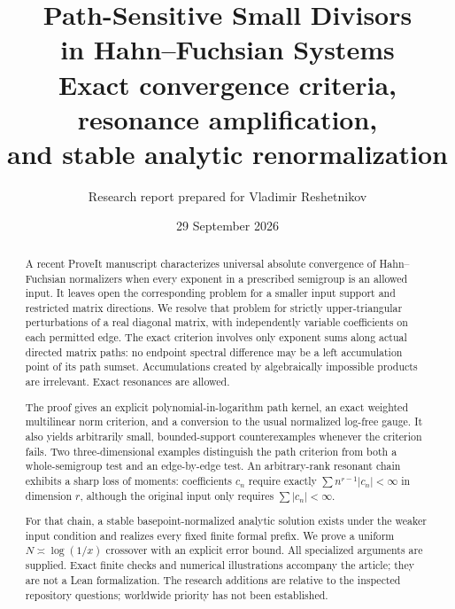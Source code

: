 \documentclass[11pt,a4paper]{article}
\title{\textbf{Path-Sensitive Small Divisors\\in Hahn--Fuchsian Systems}\\[5pt]
\large Exact convergence criteria, resonance amplification,\\and stable analytic renormalization}
\author{Research report prepared for Vladimir Reshetnikov}
\date{29 September 2026}
\numberwithin{equation}{section}
\theoremstyle{definition}
\theoremstyle{remark}
\begin{document}
\maketitle
\thispagestyle{plain}
\begin{abstract}
A recent ProveIt manuscript characterizes universal absolute convergence of
Hahn--Fuchsian normalizers when every exponent in a prescribed semigroup is
an allowed input. It leaves open the corresponding problem for a smaller
input support and restricted matrix directions. We resolve that problem for
strictly upper-triangular perturbations of a real diagonal matrix, with
independently variable coefficients on each permitted edge. The exact
criterion involves only exponent sums along actual directed matrix paths:
no endpoint spectral difference may be a left accumulation point of its
path sumset. Accumulations created by algebraically impossible products are
irrelevant. Exact resonances are allowed.

The proof gives an explicit polynomial-in-logarithm path kernel, an exact
weighted multilinear norm criterion, and a conversion to the usual
normalized log-free gauge. It also yields arbitrarily small,
bounded-support counterexamples whenever the criterion fails. Two
three-dimensional examples distinguish the path criterion from both a
whole-semigroup test and an edge-by-edge test. An arbitrary-rank resonant
chain exhibits a sharp loss of moments: coefficients $c_n$ require exactly
$\sum n^{r-1}|c_n|<\infty$ in dimension $r$, although the original input
only requires $\sum|c_n|<\infty$.

For that chain, a stable basepoint-normalized analytic solution exists under
the weaker input condition and realizes every fixed finite formal prefix.
We prove a uniform $N\asymp\log(1/x)$ crossover with an explicit error bound.
All specialized arguments are supplied. Exact finite checks and numerical
illustrations accompany the article; they are not a Lean formalization.
The research additions are relative to the inspected repository questions;
worldwide priority has not been established.
\end{abstract}

\newpage
\setcounter{tocdepth}{1}
\tableofcontents
\vspace{12pt}
\end{document}
